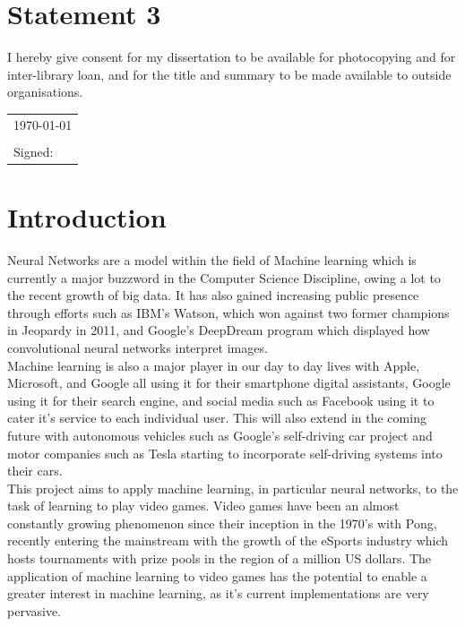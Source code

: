 \documentclass[10pt]{article}
\begin{document}
\section*{Statement 3}

I hereby give consent for my dissertation to be available for
photocopying and for inter-library loan, and for the title and summary
to be made available to outside organisations.

\vspace{0.5cm}
\begin{tabular}{l}
\today\\
\\
Signed:
\end{tabular}

\newpage
\tableofcontents
\newpage

\section{Introduction}
	Neural Networks are a model within the field of Machine learning which is currently a major buzzword in the Computer Science Discipline, owing a lot to the recent growth of big data. It has also gained increasing public presence through efforts such as IBM's Watson, which won against two former champions in Jeopardy in 2011, and Google's DeepDream program which displayed how convolutional neural networks interpret images.\\
	Machine learning is also a major player in our day to day lives with Apple, Microsoft, and Google all using it for their smartphone digital assistants, Google using it for their search engine, and social media such as Facebook using it to cater it's service to each individual user. This will also extend in the coming future with autonomous vehicles such as Google's self-driving car project and motor companies such as Tesla starting to incorporate self-driving systems into their cars.\\
	
	This project aims to apply machine learning, in particular neural networks, to the task of learning to play video games. Video games have been an almost constantly growing phenomenon since their inception in the 1970's with Pong, recently entering the mainstream with the growth of the eSports industry which hosts tournaments with prize pools in the region of a million US dollars. The application of machine learning to video games has the potential to enable a greater interest in machine learning, as it's current implementations are very pervasive.\\
	
\end{document}
